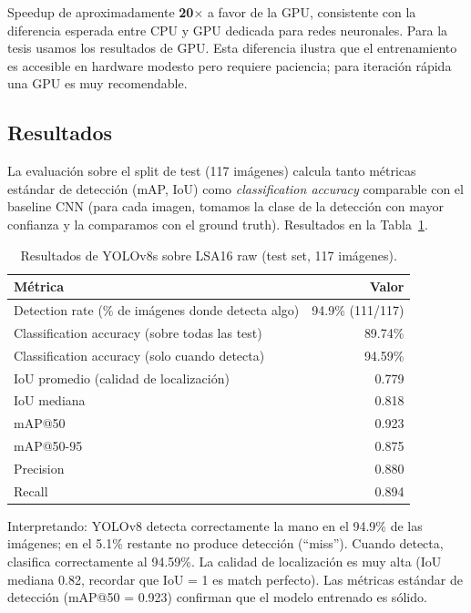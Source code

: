 \documentclass[a4paper,11pt]{article}
\begin{document}
Speedup de aproximadamente \textbf{20$\times$} a favor de la GPU, consistente con la diferencia esperada entre CPU y GPU dedicada para redes neuronales. Para la tesis usamos los resultados de GPU. Esta diferencia ilustra que el entrenamiento es accesible en hardware modesto pero requiere paciencia; para iteración rápida una GPU es muy recomendable.

\subsection{Resultados}

La evaluación sobre el split de test (117 imágenes) calcula tanto métricas estándar de detección (mAP, IoU) como \textit{classification accuracy} comparable con el baseline CNN (para cada imagen, tomamos la clase de la detección con mayor confianza y la comparamos con el ground truth). Resultados en la Tabla~\ref{tab:yolo-results}.

\begin{table}[h]
\centering
\caption{Resultados de YOLOv8s sobre LSA16 raw (test set, 117 imágenes).}
\label{tab:yolo-results}
\begin{tabular}{lr}
\toprule
\textbf{Métrica} & \textbf{Valor} \\
\midrule
Detection rate (\% de imágenes donde detecta algo) & 94.9\% (111/117) \\
Classification accuracy (sobre todas las test) & 89.74\% \\
Classification accuracy (solo cuando detecta) & 94.59\% \\
IoU promedio (calidad de localización) & 0.779 \\
IoU mediana & 0.818 \\
mAP@50 & 0.923 \\
mAP@50-95 & 0.875 \\
Precision & 0.880 \\
Recall & 0.894 \\
\bottomrule
\end{tabular}
\end{table}

Interpretando: YOLOv8 detecta correctamente la mano en el 94.9\% de las imágenes; en el 5.1\% restante no produce detección (``miss''). Cuando detecta, clasifica correctamente al 94.59\%. La calidad de localización es muy alta (IoU mediana 0.82, recordar que IoU = 1 es match perfecto). Las métricas estándar de detección (mAP@50 = 0.923) confirman que el modelo entrenado es sólido.
\end{document}
